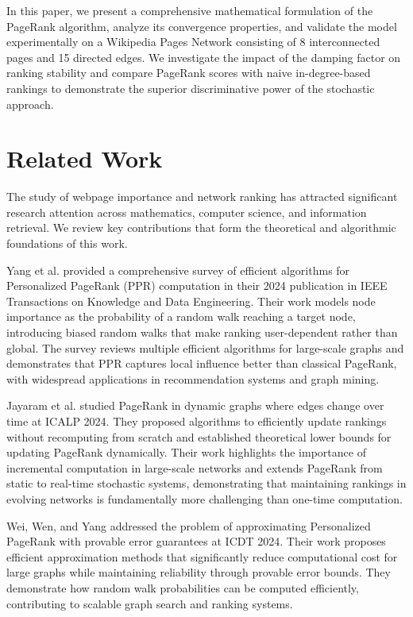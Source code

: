 \documentclass[conference]{IEEEtran}
\begin{document}
In this paper, we present a comprehensive mathematical formulation of the PageRank algorithm, analyze its convergence properties, and validate the model experimentally on a Wikipedia Pages Network consisting of 8 interconnected pages and 15 directed edges. We investigate the impact of the damping factor on ranking stability and compare PageRank scores with naive in-degree-based rankings to demonstrate the superior discriminative power of the stochastic approach.

\section{Related Work}
The study of webpage importance and network ranking has attracted significant research attention across mathematics, computer science, and information retrieval. We review key contributions that form the theoretical and algorithmic foundations of this work.

Yang et al. \cite{b8} provided a comprehensive survey of efficient algorithms for Personalized PageRank (PPR) computation in their 2024 publication in IEEE Transactions on Knowledge and Data Engineering. Their work models node importance as the probability of a random walk reaching a target node, introducing biased random walks that make ranking user-dependent rather than global. The survey reviews multiple efficient algorithms for large-scale graphs and demonstrates that PPR captures local influence better than classical PageRank, with widespread applications in recommendation systems and graph mining.

Jayaram et al. \cite{b9} studied PageRank in dynamic graphs where edges change over time at ICALP 2024. They proposed algorithms to efficiently update rankings without recomputing from scratch and established theoretical lower bounds for updating PageRank dynamically. Their work highlights the importance of incremental computation in large-scale networks and extends PageRank from static to real-time stochastic systems, demonstrating that maintaining rankings in evolving networks is fundamentally more challenging than one-time computation.

Wei, Wen, and Yang \cite{b10} addressed the problem of approximating Personalized PageRank with provable error guarantees at ICDT 2024. Their work proposes efficient approximation methods that significantly reduce computational cost for large graphs while maintaining reliability through provable error bounds. They demonstrate how random walk probabilities can be computed efficiently, contributing to scalable graph search and ranking systems.
\end{document}
